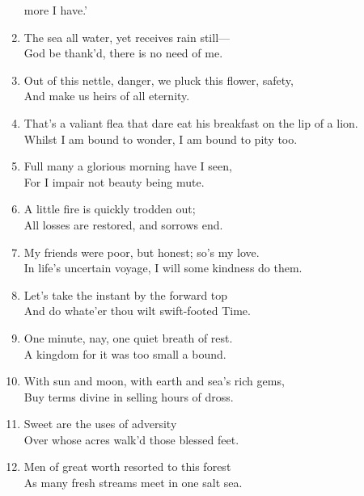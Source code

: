 \documentclass[17pt]{extarticle}
\begin{document}
\begin{enumerate}
  more I have.'
\item
  The sea all water, yet receives rain still---\\God be thank'd, there
  is no need of me.
\item
  Out of this nettle, danger, we pluck this flower, safety,\\And make us
  heirs of all eternity.
\item
  That's a valiant flea that dare eat his breakfast on the lip of a
  lion.\\Whilst I am bound to wonder, I am bound to pity too.
\item
  Full many a glorious morning have I seen,\\For I impair not beauty
  being mute.
\item
  A little fire is quickly trodden out;\\All losses are restored, and
  sorrows end.
\item
  My friends were poor, but honest; so's my love.\\In life's uncertain
  voyage, I will some kindness do them.
\item
  Let's take the instant by the forward top\\And do whate'er thou wilt
  swift-footed Time.
\item
  One minute, nay, one quiet breath of rest.\\A kingdom for it was too
  small a bound.
\item
  With sun and moon, with earth and sea's rich gems,\\Buy terms divine
  in selling hours of dross.
\item
  Sweet are the uses of adversity\\Over whose acres walk'd those blessed
  feet.
\item
  Men of great worth resorted to this forest\\As many fresh streams meet
  in one salt sea.
\end{enumerate}
\end{document}
